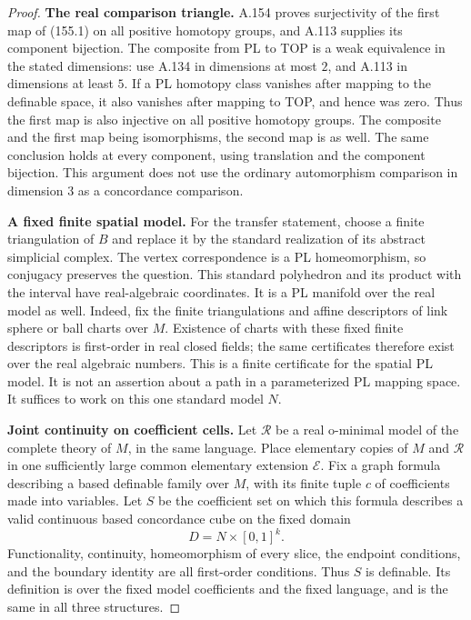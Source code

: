 \begin{proof}
\textbf{The real comparison triangle.}\quad
A.154 proves surjectivity of the first map of (155.1) on all positive
homotopy groups, and A.113 supplies its component bijection.
The composite from PL to TOP is a weak equivalence in the stated
dimensions: use A.134 in dimensions at most \(2\), and A.113 in
dimensions at least \(5\). If a PL homotopy class vanishes after
mapping to the definable space, it also vanishes after mapping to
TOP, and hence was zero. Thus the first map is also injective on
all positive homotopy groups. The composite and the first map being
isomorphisms, the second map is as well. The same conclusion holds
at every component, using translation and the component bijection.
This argument does not use the ordinary automorphism comparison in
dimension \(3\) as a concordance comparison.

\textbf{A fixed finite spatial model.}\quad
For the transfer statement, choose a finite triangulation of \(B\)
and replace it by the standard realization of its abstract simplicial
complex. The vertex correspondence is a PL homeomorphism, so conjugacy
preserves the question. This standard polyhedron and its product with
the interval have real-algebraic coordinates.
It is a PL manifold over the real model as well. Indeed, fix the
finite triangulations and affine descriptors of link sphere or ball
charts over \(M\). Existence of charts with these fixed finite
descriptors is first-order in real closed fields; the same
certificates therefore exist over the real algebraic numbers.
This is a finite certificate for the spatial PL model. It is not
an assertion about a path in a parameterized PL mapping space.
It suffices to work on this one standard model \(N\).

\textbf{Joint continuity on coefficient cells.}\quad
Let \(\mathcal R\) be a real o-minimal model of the complete theory
of \(M\), in the same language. Place elementary copies of \(M\)
and \(\mathcal R\) in one sufficiently large common elementary
extension \(\mathcal E\).
Fix a graph formula describing a based definable family over \(M\),
with its finite tuple \(c\) of coefficients made into variables.
Let \(S\) be the coefficient set on which this formula describes a
valid continuous based concordance cube on the fixed domain
\[
 D=N\times[0,1]^k.
\]
Functionality, continuity, homeomorphism of every slice, the endpoint
conditions, and the boundary identity are all first-order conditions.
Thus \(S\) is definable. Its definition is over the fixed model
coefficients and the fixed language, and is the same in all three
structures.


\end{proof}
